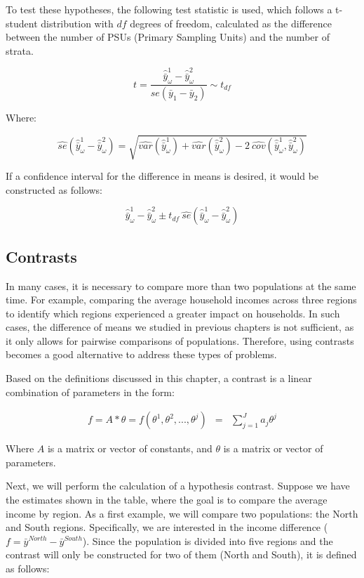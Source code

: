 \documentclass[
  12pt,
]{book}
\begin{document}
To test these hypotheses, the following test statistic is used, which follows a t-student distribution with \(df\) degrees of freedom, calculated as the difference between the number of PSUs (Primary Sampling Units) and the number of strata.

\[
t = \frac{\hat{\bar{y}}_{\omega}^{1}-\hat{\bar{y}}_{\omega}^{2}}{se\left(\bar{y}_{1}-\bar{y}_{2}\right)} \sim t_{df}
\]

Where:

\[
\widehat{se}\left(\hat{\bar{y}}_{\omega}^{1}-\hat{\bar{y}}_{\omega}^{2}\right) = \sqrt{\widehat{var}\left(\hat{\bar{y}}_{\omega}^{1}\right) + \widehat{var}\left(\hat{\bar{y}}_{\omega}^{2}\right) - 2 \  \widehat{cov}\left(\hat{\bar{y}}_{\omega}^{1},\hat{\bar{y}}_{\omega}^{2}\right)}
\]

If a confidence interval for the difference in means is desired, it would be constructed as follows:

\[
\hat{\bar{y}}_{\omega}^{1}-\hat{\bar{y}}_{\omega}^{2} \pm t_{df}\ \widehat{se}\left(\hat{\bar{y}}_{\omega}^{1}-\hat{\bar{y}}_{\omega}^{2}\right)
\]

\hypertarget{contrasts}{%
\subsection{Contrasts}\label{contrasts}}

In many cases, it is necessary to compare more than two populations at the same time. For example, comparing the average household incomes across three regions to identify which regions experienced a greater impact on households. In such cases, the difference of means we studied in previous chapters is not sufficient, as it only allows for pairwise comparisons of populations. Therefore, using contrasts becomes a good alternative to address these types of problems.

Based on the definitions discussed in this chapter, a contrast is a linear combination of parameters in the form:

\begin{eqnarray*}
f = A * \theta = f\left(\theta^{1},\theta^{2},...,\theta^{j}\right) & = & \sum_{j=1}^{J}a_{j}\theta^{j}
\end{eqnarray*}

Where \(A\) is a matrix or vector of constants, and \(\theta\) is a matrix or vector of parameters.

Next, we will perform the calculation of a hypothesis contrast. Suppose we have the estimates shown in the table, where the goal is to compare the average income by region. As a first example, we will compare two populations: the North and South regions. Specifically, we are interested in the income difference (\(f = \bar{y}^{North} - \bar{y}^{South}\)). Since the population is divided into five regions and the contrast will only be constructed for two of them (North and South), it is defined as follows:
\end{document}
